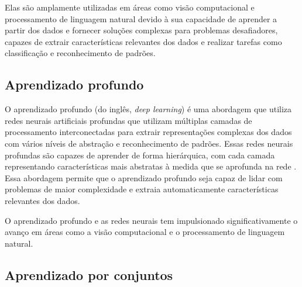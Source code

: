 Elas são amplamente utilizadas em áreas como visão computacional e processamento de linguagem natural devido à sua capacidade de aprender a partir dos dados e fornecer soluções complexas para problemas desafiadores, capazes de extrair características relevantes dos dados e realizar tarefas como classificação e reconhecimento de padrões.




\subsection{Aprendizado profundo}

O aprendizado profundo (do inglês, \textit{deep learning}) é uma abordagem que utiliza redes neurais artificiais profundas que utilizam múltiplas camadas de processamento interconectadas para extrair representações complexas dos dados com vários níveis de abstração e reconhecimento de padrões. Essas redes neurais profundas são capazes de aprender de forma hierárquica, com cada camada representando características mais abstratas à medida que se aprofunda na rede \cite{AurelienGeron2019}. Essa abordagem permite que o aprendizado profundo seja capaz de lidar com problemas de maior complexidade e extraia automaticamente características relevantes dos dados.

O aprendizado profundo e as redes neurais tem impulsionado significativamente o avanço em áreas como a visão computacional e o processamento de linguagem natural.

\subsection{Aprendizado por conjuntos}

